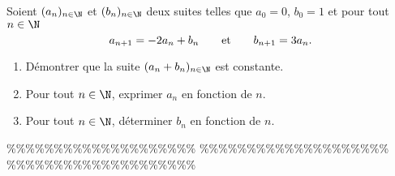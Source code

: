 



\begin{exercice} \;
Soient $(a_n)_{n\in\N}$ et $(b_n)_{n\in\N}$ deux suites telles que $a_0=0$, $b_0=1$ et pour tout $n\in\N$
$$a_{n+1}=-2a_n+b_n\qquad \hbox{et}\qquad b_{n+1}=3a_n.$$
\begin{enumerate}
\item D\'emontrer que la suite $(a_n+b_n)_{n\in\N}$ est constante.
\item Pour tout $n\in\N$, exprimer $a_n$ en fonction de $n$.
\item Pour tout $n\in\N$, d\'eterminer $b_n$ en fonction de $n$.
\end{enumerate}
\end{exercice}


\%\%\%\%\%\%\%\%\%\%\%\%\%\%\%\%\%\%\%\%
\%\%\%\%\%\%\%\%\%\%\%\%\%\%\%\%\%\%\%\%
\%\%\%\%\%\%\%\%\%\%\%\%\%\%\%\%\%\%\%\%





